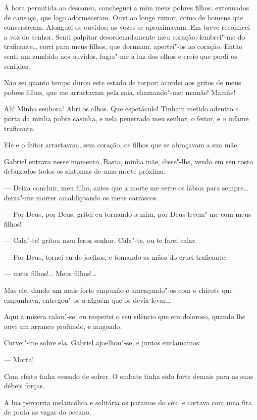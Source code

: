 À hora permitida ao descanso, concheguei a mim meus pobres filhos,
extenuados de cansaço, que logo adormeceram. Ouvi ao longe rumor, como
de homens que conversavam. Alonguei os ouvidos; as vozes se aproximavam.
Em breve reconheci a voz do senhor. Senti palpitar desordenadamente meu
coração; lembrei"-me do traficante\ldots{} corri para meus filhos, que
dormiam, apertei"-os ao coração. Então senti um zumbido nos ouvidos,
fugiu"-me a luz dos olhos e creio que perdi os sentidos.

Não sei quanto tempo durou este estado de torpor; acordei aos gritos de
meus pobres filhos, que me arrastavam pela saia, chamando"-me: mamãe!
Mamãe!

Ah! Minha senhora! Abri os olhos. Que espetáculo! Tinham metido adentro
a porta da minha pobre casinha, e nela penetrado meu senhor, o feitor, e
o infame traficante.

Ele e o feitor arrastavam, sem coração, os filhos que se abraçavam a sua
mãe.

Gabriel entrava nesse momento. Basta, minha mãe, disse"-lhe, vendo em seu
rosto debuxados todos os sintomas de uma morte próxima.

--- Deixa concluir, meu filho, antes que a morte me cerre os lábios para
sempre\ldots{} deixa"-me morrer amaldiçoando os meus carrascos.

--- Por Deus, por Deus, gritei eu tornando a mim, por Deus levem"-me com
meus filhos!

--- Cala"-te! gritou meu feroz senhor. Cala"-te, ou te farei calar.

--- Por Deus, tornei eu de joelhos, e tomando as mãos do cruel
traficante:

--- meus filhos!\ldots{} Meus filhos!\ldots{}

Mas ele, dando um mais forte empuxão e ameaçando"-os com o chicote que
empunhava, entregou"-os a alguém que os devia levar\ldots{}

Aqui a mísera calou"-se; eu respeitei o seu silêncio que era doloroso,
quando lhe ouvi um arranco profundo, e magoado.

Curvei"-me sobre ela. Gabriel ajoelhou"-se, e juntos exclamamos:

--- Morta!

Com efeito tinha cessado de sofrer. O embate tinha sido forte demais
para as suas débeis forças.

A lua percorria melancólica e solitária os paramos do céu, e cortava com
uma fita de prata as vagas do oceano.

